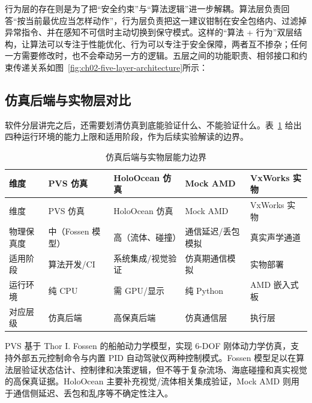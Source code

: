 行为层的存在则是为了把``安全约束''与``算法逻辑''进一步解耦。算法层负责回答``按当前最优应当怎样动作''，行为层负责把这一建议钳制在安全包络内、过滤掉异常指令、并在感知不可信时主动切换到保守模式。这样的``算法 + 行为''双层结构，让算法可以专注于性能优化、行为可以专注于安全保障，两者互不掺杂；任何一方需要修改时，也不会牵动另一方的逻辑。五层之间的功能职责、相邻接口和约束传递关系如图~\ref{fig:ch02-five-layer-architecture}所示：

\subsection{仿真后端与实物层对比}\label{sec:ch02-2-2-3}

软件分层讲完之后，还需要划清仿真到底能验证什么、不能验证什么。表~\ref{tab:ch02-backends} 给出四种运行环境的能力上限和适用阶段，作为后续实验解读的边界。

\begin{longtable}[]{@{}
  >{\raggedright\arraybackslash}p{}
  >{\raggedright\arraybackslash}p{}
  >{\raggedright\arraybackslash}p{}
  >{\raggedright\arraybackslash}p{}
  >{\raggedright\arraybackslash}p{}@{}}
\caption{仿真后端与实物层能力边界}\label{tab:ch02-backends}\tabularnewline
\toprule\noalign{}
维度 & PVS 仿真 & HoloOcean 仿真 & Mock AMD & VxWorks 实物 \\
\midrule\noalign{}
\endfirsthead
\toprule\noalign{}
维度 & PVS 仿真 & HoloOcean 仿真 & Mock AMD & VxWorks 实物 \\
\midrule\noalign{}
\endhead
\bottomrule\noalign{}
\endlastfoot
物理保真度 & 中（Fossen 模型） & 高（流体、碰撞） & 通信延迟/丢包模拟 & 真实声学通道 \\
适用阶段 & 算法开发/CI & 系统集成/视觉验证 & 仿真期通信模拟 & 实物部署 \\
运行环境 & 纯 CPU & 需 GPU/显示 & 纯 Python & AMD 嵌入式板 \\
对应层级 & 仿真后端 & 高保真后端 & 仿真通信层 & 执行层 \\
\end{longtable}

PVS 基于 Thor I. Fossen 的船舶动力学模型\cite{fossen2011handbook}，实现 6-DOF 刚体动力学仿真，支持外部五元控制命令与内置 PID 自动驾驶仪两种控制模式。Fossen 模型足以在算法层验证状态估计、控制律和决策逻辑，但不等于复杂流场、海底碰撞和真实视觉的高保真证据。HoloOcean 主要补充视觉/流体相关集成验证，Mock AMD 则用于通信侧延迟、丢包和乱序等不确定性注入。

